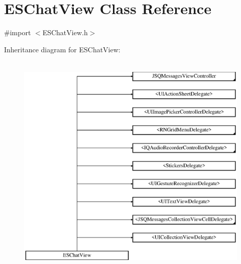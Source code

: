 \hypertarget{interface_e_s_chat_view}{}\section{E\+S\+Chat\+View Class Reference}
\label{interface_e_s_chat_view}


{\ttfamily \#import $<$E\+S\+Chat\+View.\+h$>$}

Inheritance diagram for E\+S\+Chat\+View\+:\begin{figure}[H]
\begin{center}
\leavevmode
\includegraphics[height=11.000000cm]{interface_e_s_chat_view}
\end{center}
\end{figure}
